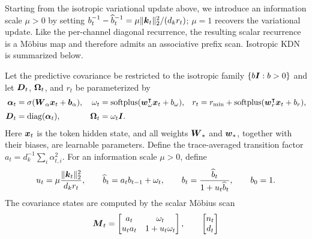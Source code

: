 \documentclass{article} %
\begin{document}
Starting from the isotropic variational update above, we introduce an information scale $\mu>0$
by setting
$b_t^{-1}-\widehat b_t^{-1}=\mu\|\boldsymbol{k}_t\|_2^2/(d_k r_t)$; $\mu=1$ recovers the
variational update.
Like the per-channel diagonal recurrence, the resulting scalar recurrence is a M\"obius map and
therefore admits an associative prefix scan. Isotropic KDN is summarized below.

\label{prop:isotropic-kalman-linear-attention}
\begin{tcolorbox}[
  title={Proposition~\thedefinition: Isotropic Kalman Delta Network},
  breakable,
  colback=blue!7,
  colbacktitle=blue!22,
  colframe=blue!45!black,
  coltitle=black,
  fonttitle=\bfseries,
  boxrule=0.4pt,
  arc=1pt,
  left=5pt,
  right=5pt,
  top=5pt,
  bottom=5pt
]
Let the predictive covariance be restricted to the isotropic family
$\{b\boldsymbol{I}:b>0\}$ and let
$\boldsymbol{D}_t$, $\boldsymbol{\Omega}_t$, and $r_t$ be parameterized by
\begin{equation}
\begin{aligned}
  \boldsymbol{\alpha}_t &= \sigma(\boldsymbol{W}_{\alpha}\boldsymbol{x}_t+\boldsymbol{b}_{\alpha}),
  &
  \omega_t &= \operatorname{softplus}(\boldsymbol{w}_{\omega}^{\intercal}\boldsymbol{x}_t+b_\omega),
  &
  r_t &= r_{\min}+\operatorname{softplus}(\boldsymbol{w}_{r}^{\intercal}\boldsymbol{x}_t+b_r),
  \\[2pt]
  \boldsymbol{D}_t &= \operatorname{diag}(\boldsymbol{\alpha}_t),
  &
  \boldsymbol{\Omega}_t &= \omega_t\boldsymbol{I}.
\end{aligned}
\label{eq:iso-kla-box-parameterization}
\end{equation}
Here $\boldsymbol{x}_t$ is the token hidden state, and all weights $\boldsymbol{W}_{\ast}$ and
$\boldsymbol{w}_{\ast}$, together with their biases, are learnable parameters.
Define the trace-averaged transition factor
$a_t=d_k^{-1}\sum_i\alpha_{t,i}^2$.
For an information scale $\mu>0$, define
\begin{equation}
  u_t=\mu\frac{\|\boldsymbol{k}_t\|_2^2}{d_k r_t},
  \qquad
  \widehat b_t
  =a_tb_{t-1}+\omega_t,
  \qquad
  b_t
  =\frac{\widehat b_t}{1+u_t\widehat b_t},
  \qquad b_0=1.
  \label{eq:iso-kla-box-cov-update}
\end{equation}
The covariance states are computed by the scalar M\"obius scan
\begin{equation}
  \ve{M}_t=
  \begin{bmatrix}
    a_t & \omega_t\\
    u_ta_t & 1+u_t\omega_t
  \end{bmatrix},
  \qquad
  \begin{bmatrix}n_t\\ d_t\end{bmatrix}

\end{equation}
\end{tcolorbox}
\end{document}
